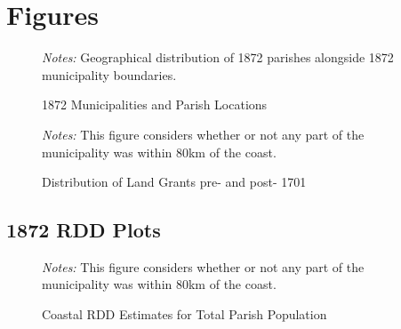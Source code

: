 \documentclass{article}
\begin{document}
\clearpage

\section*{Figures}

\begin{figure}[h!]
  \caption{1872 Municipalities and Parish Locations}
  \begin{center}
  \textit{Notes:} Geographical distribution of 1872 parishes alongside 1872 municipality boundaries.
  \end{center}
  \label{fig:parishes_1872}
\end{figure}

\begin{figure}
  \caption{Distribution of Land Grants pre- and post- 1701}
  \begin{center}
  \textit{Notes:} This figure considers whether or not any part of the municipality was within 80km of the coast.
  \end{center}
  \label{fig:SesmariasDistribution}
\end{figure}

\clearpage

\subsection*{1872 RDD Plots}

\begin{figure}[h!]
  \caption{Coastal RDD Estimates for Total Parish Population}
  \begin{center}
  \textit{Notes:} This figure considers whether or not any part of the municipality was within 80km of the coast.
  \end{center}
  \label{fig:1872_RDD_Population}
\end{figure}
\end{document}
